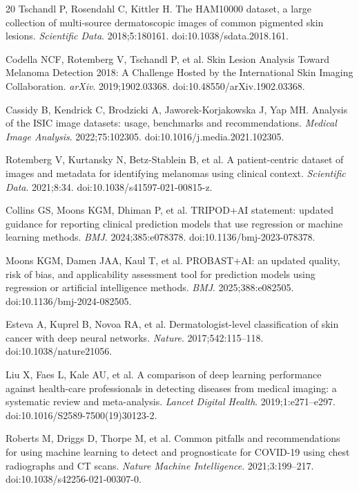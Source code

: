 \documentclass[11pt]{article}
\begin{document}
\begin{thebibliography}{20}
Tschandl P, Rosendahl C, Kittler H. The HAM10000 dataset, a large collection of multi-source dermatoscopic images of common pigmented skin lesions. \textit{Scientific Data}. 2018;5:180161. doi:10.1038/sdata.2018.161.

Codella NCF, Rotemberg V, Tschandl P, et al. Skin Lesion Analysis Toward Melanoma Detection 2018: A Challenge Hosted by the International Skin Imaging Collaboration. \textit{arXiv}. 2019;1902.03368. doi:10.48550/arXiv.1902.03368.

Cassidy B, Kendrick C, Brodzicki A, Jaworek-Korjakowska J, Yap MH. Analysis of the ISIC image datasets: usage, benchmarks and recommendations. \textit{Medical Image Analysis}. 2022;75:102305. doi:10.1016/j.media.2021.102305.

Rotemberg V, Kurtansky N, Betz-Stablein B, et al. A patient-centric dataset of images and metadata for identifying melanomas using clinical context. \textit{Scientific Data}. 2021;8:34. doi:10.1038/s41597-021-00815-z.

Collins GS, Moons KGM, Dhiman P, et al. TRIPOD+AI statement: updated guidance for reporting clinical prediction models that use regression or machine learning methods. \textit{BMJ}. 2024;385:e078378. doi:10.1136/bmj-2023-078378.

Moons KGM, Damen JAA, Kaul T, et al. PROBAST+AI: an updated quality, risk of bias, and applicability assessment tool for prediction models using regression or artificial intelligence methods. \textit{BMJ}. 2025;388:e082505. doi:10.1136/bmj-2024-082505.

Esteva A, Kuprel B, Novoa RA, et al. Dermatologist-level classification of skin cancer with deep neural networks. \textit{Nature}. 2017;542:115--118. doi:10.1038/nature21056.

Liu X, Faes L, Kale AU, et al. A comparison of deep learning performance against health-care professionals in detecting diseases from medical imaging: a systematic review and meta-analysis. \textit{Lancet Digital Health}. 2019;1:e271--e297. doi:10.1016/S2589-7500(19)30123-2.

Roberts M, Driggs D, Thorpe M, et al. Common pitfalls and recommendations for using machine learning to detect and prognosticate for COVID-19 using chest radiographs and CT scans. \textit{Nature Machine Intelligence}. 2021;3:199--217. doi:10.1038/s42256-021-00307-0.
\end{thebibliography}
\end{document}
